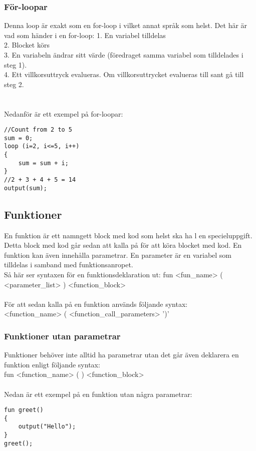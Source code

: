 \documentclass{TDP003mall}
\begin{document}
\subsubsection{För-loopar}
Denna loop är exakt som en for-loop i vilket annat språk som helst. Det här är vad som händer i en for-loop:
1. En variabel tilldelas\\
2. Blocket körs\\
3. En variabeln ändrar sitt värde (föredraget samma variabel som tilldelades i steg 1).\\
4. Ett villkorsuttryck evalueras. Om villkorsuttrycket evalueras till sant gå till steg 2.\\
\\\\
Nedanför är ett exempel på for-loopar:
\begin{lstlisting}
//Count from 2 to 5
sum = 0;
loop (i=2, i<=5, i++)
{
	sum = sum + i;
}
//2 + 3 + 4 + 5 = 14
output(sum);
\end{lstlisting}

\subsection{Funktioner}
En funktion är ett namngett block med kod som helst ska ha l en specieluppgift. Detta block med kod går sedan att kalla på för att köra blocket med kod. En funktion kan även innehålla parametrar. En parameter är en variabel som tilldelas i samband med funktionsanropet.
\\
Så här ser syntaxen för en funktionsdeklaration ut:
fun <fun\_name> ( <parameter\_list> ) <function\_block>
\\\\
För att sedan kalla på en funktion används följande syntax:\\
<function\_name> ( <function\_call\_parameters> ')'
\subsubsection{Funktioner utan parametrar}
Funktioner behöver inte alltid ha parametrar utan det går även deklarera en funktion enligt följande syntax:\\
fun <function\_name> ( ) <function\_block>
\\\\
Nedan är ett exempel på en funktion utan några parametrar:
\begin{lstlisting}
fun greet()
{
	output("Hello");
}
greet();
\end{lstlisting}
\end{document}
